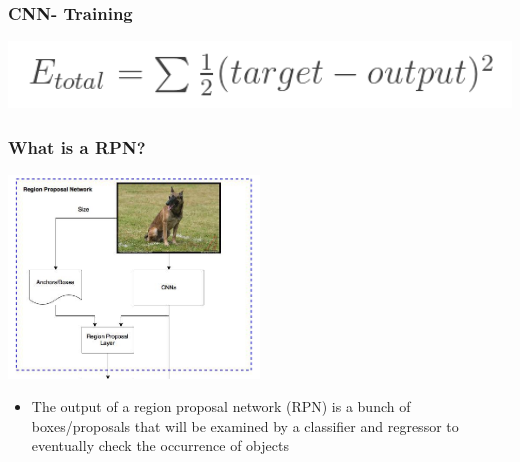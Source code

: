\documentclass{beamer}
\begin{document}
    \begin{frame}
       \frametitle{CNN- Training}
        \centering
          \includegraphics[width=1.0\textwidth]{images/Equation.png}
    \end{frame}
    
    \begin{frame}
       \frametitle{What is a RPN?}
       \centering
        \includegraphics[width=0.5\textwidth]{images/rpn.PNG}
        \begin{itemize}
            \item The output of a region proposal network (RPN) is a bunch of boxes/proposals that will be examined by a classifier and regressor to eventually check the occurrence of objects
        \end{itemize}
    \end{frame}
    
\end{document}
